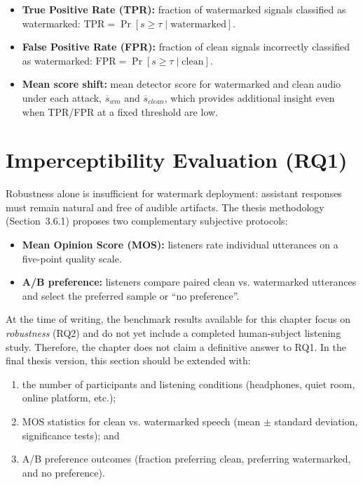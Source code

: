 \begin{itemize}
    \item \textbf{True Positive Rate (TPR):} fraction of watermarked signals
    classified as watermarked:
    $\mathrm{TPR}=\Pr[s\ge\tau \mid \text{watermarked}]$.
    \item \textbf{False Positive Rate (FPR):} fraction of clean signals
    incorrectly classified as watermarked:
    $\mathrm{FPR}=\Pr[s\ge\tau \mid \text{clean}]$.
    \item \textbf{Mean score shift:} mean detector score for watermarked and
    clean audio under each attack, $\overline{s}_{wm}$ and $\overline{s}_{clean}$,
    which provides additional insight even when TPR/FPR at a fixed threshold are
    low.
\end{itemize}

\section{Imperceptibility Evaluation (RQ1)}
\label{sec:wm-imperceptibility}

Robustness alone is insufficient for watermark deployment: assistant responses
must remain natural and free of audible artifacts. The thesis methodology
(Section~3.6.1) proposes two complementary subjective protocols:

\begin{itemize}
    \item \textbf{Mean Opinion Score (MOS):} listeners rate individual utterances
    on a five-point quality scale.
    \item \textbf{A/B preference:} listeners compare paired clean vs. watermarked
    utterances and select the preferred sample or ``no preference''.
\end{itemize}

At the time of writing, the benchmark results available for this chapter focus on
\emph{robustness} (RQ2) and do not yet include a completed human-subject
listening study. Therefore, the chapter does not claim a definitive answer to
RQ1. In the final thesis version, this section should be extended with:

\begin{enumerate}
    \item the number of participants and listening conditions (headphones,
    quiet room, online platform, etc.);
    \item MOS statistics for clean vs. watermarked speech (mean $\pm$ standard
    deviation, significance tests); and
    \item A/B preference outcomes (fraction preferring clean, preferring
    watermarked, and no preference).
\end{enumerate}

